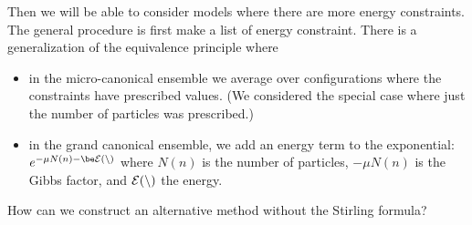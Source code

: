 Then we will be able to consider models where there are more energy constraints. The general procedure is first make a list of energy constraint. There is a generalization of the equivalence principle where 
\begin{itemize}
\item
in the micro-canonical ensemble we average over configurations where the constraints have prescribed values. (We considered the special case where just the number of particles was prescribed.) %
\item 
in the grand canonical ensemble, we add an energy term to the exponential: $e^{-\mu N(n) - \be\cal E(n)}$ where $N(n)$ is the number of particles, $-\mu N(n)$ is the Gibbs factor, and $\cal E(n)$ the energy.
\end{itemize}

How can we construct an alternative method without the Stirling formula?

